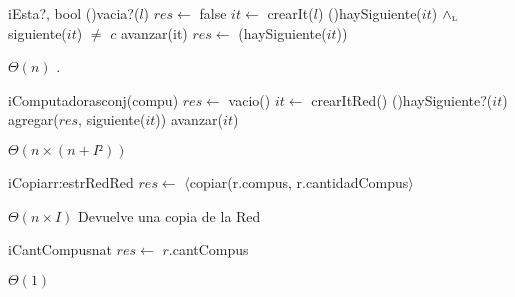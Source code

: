 \begin{Algoritmos}
  \begin{algoritmo}{iEsta?}{, }{bool}
    \eIf(){vacia?($l$)}{
      $res \gets$ false
    }{
     $it \gets$ crearIt($l$)
      \While(){haySiguiente($it$) $\land_{\mathrm{\scriptscriptstyle{L}}}$ siguiente($it$) $\neq$ $c$}{
        avanzar(it)
      }
    }
    $res \gets$ (haySiguiente($it$))
  \end{algoritmo}
  {} %
  {} %
  {$\Theta(n)$} %
  {.} %

  \begin{algoritmo}{iComputadoras}{}{conj(compu)}{}
    $res \gets$ vacio()
     $it \gets$ crearItRed()
    \While(){haySiguiente?($it$)}{
      agregar($res$, siguiente($it$))
      avanzar($it$)
    }
  \end{algoritmo}
  \datosAlgoritmo{} %
  {} %
  {} %
  {$\Theta(n \times (n+I²))$} %
  {} %
   
  \begin{algoritmo}{iCopiar}{\In r:estrRed}{Red}
   	$res \gets$ $\langle$copiar(r.compus, r.cantidadCompus$\rangle$
  \end{algoritmo}
  \datosAlgoritmo{} %
  {} %
  {} %
  {$\Theta(n \times I)$} %
  {Devuelve una copia de la Red} %

  \begin{algoritmo}{iCantCompus}{}{nat}
    $res \gets$ $r$.cantCompus
  \end{algoritmo}   
  \datosAlgoritmo{} %
  {} %
  {} %
  {$\Theta(1)$} %
  {} %

\end{Algoritmos}
